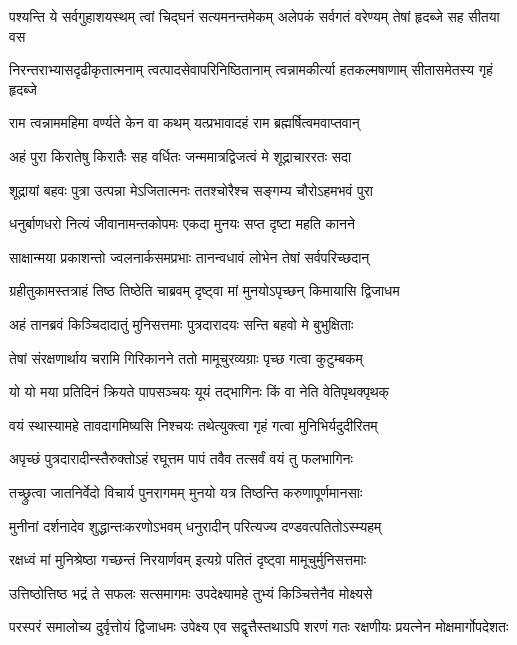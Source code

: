 \fourlineindentedshloka
{पश्यन्ति ये सर्वगुहाशयस्थम्}
{त्वां चिद्घनं सत्यमनन्तमेकम्}
{अलेपकं सर्वगतं वरेण्यम्}
{तेषां हृदब्जे सह सीतया वस} %

\fourlineindentedshloka
{निरन्तराभ्यासदृढीकृतात्मनाम्}
{त्वत्पादसेवापरिनिष्ठितानाम्}
{त्वन्नामकीर्त्या हतकल्मषाणाम्}
{सीतासमेतस्य गृहं हृदब्जे} %

\twolineshloka
{राम त्वन्नाममहिमा वर्ण्यते केन वा कथम्}
{यत्प्रभावादहं राम ब्रह्मर्षित्वमवाप्तवान्} %

\twolineshloka
{अहं पुरा किरातेषु किरातैः सह वर्धितः}
{जन्ममात्रद्विजत्वं मे शूद्राचाररतः सदा} %

\twolineshloka
{शूद्रायां बहवः पुत्रा उत्पन्ना मेऽजितात्मनः}
{ततश्चोरैश्च सङ्गम्य चौरोऽहमभवं पुरा} %

\twolineshloka
{धनुर्बाणधरो नित्यं जीवानामन्तकोपमः}
{एकदा मुनयः सप्त दृष्टा महति कानने} %

\twolineshloka
{साक्षान्मया प्रकाशन्तो ज्वलनार्कसमप्रभाः}
{तानन्वधावं लोभेन तेषां सर्वपरिच्छदान्} %

\twolineshloka
{ग्रहीतुकामस्तत्राहं तिष्ठ तिष्ठेति चाब्रवम्}
{दृष्ट्वा मां मुनयोऽपृच्छन् किमायासि द्विजाधम} %

\twolineshloka
{अहं तानब्रवं किञ्चिदादातुं मुनिसत्तमाः}
{पुत्रदारादयः सन्ति बहवो मे बुभुक्षिताः} %

\twolineshloka
{तेषां संरक्षणार्थाय चरामि गिरिकानने}
{ततो मामूचुरव्यग्राः पृच्छ गत्वा कुटुम्बकम्} %

\twolineshloka
{यो यो मया प्रतिदिनं क्रियते पापसञ्चयः}
{यूयं तद्भागिनः किं वा नेति वेतिपृथक्पृथक्} %

\twolineshloka
{वयं स्थास्यामहे तावदागमिष्यसि निश्चयः}
{तथेत्युक्त्वा गृहं गत्वा मुनिभिर्यदुदीरितम्} %

\twolineshloka
{अपृच्छं पुत्रदारादीन्स्तैरुक्तोऽहं रघूत्तम}
{पापं तवैव तत्सर्वं वयं तु फलभागिनः} %

\twolineshloka
{तच्छ्रुत्वा जातनिर्वेदो विचार्य पुनरागमम्}
{मुनयो यत्र तिष्ठन्ति करुणापूर्णमानसाः} %

\twolineshloka
{मुनीनां दर्शनादेव शुद्धान्तःकरणोऽभवम्}
{धनुरादीन् परित्यज्य दण्डवत्पतितोऽस्म्यहम्} %

\twolineshloka
{रक्षध्वं मां मुनिश्रेष्ठा गच्छन्तं निरयार्णवम्}
{इत्यग्रे पतितं दृष्ट्वा मामूचुर्मुनिसत्तमाः} %

\twolineshloka
{उत्तिष्ठोत्तिष्ठ भद्रं ते सफलः सत्समागमः}
{उपदेक्ष्यामहे तुभ्यं किञ्चित्तेनैव मोक्ष्यसे} %

\threelineshloka
{परस्परं समालोच्य दुर्वृत्तोयं द्विजाधमः}
{उपेक्ष्य एव सद्वृत्तैस्तथाऽपि शरणं गतः}
{रक्षणीयः प्रयत्नेन मोक्षमार्गोपदेशतः} %


